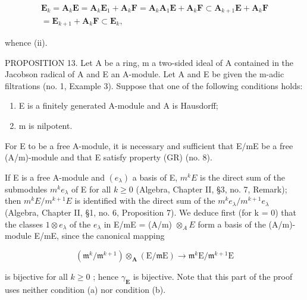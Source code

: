 \[
\begin{array}{r} \mathbf {E} _ {k} = \mathbf {A} _ {k} \mathbf {E} = \mathbf {A} _ {k} \mathbf {E} _ {1} + \mathbf {A} _ {k} \mathbf {F} = \mathbf {A} _ {k} \mathbf {A} _ {1} \mathbf {E} + \mathbf {A} _ {k} \mathbf {F} \subset \mathbf {A} _ {k + 1} \mathbf {E} + \mathbf {A} _ {k} \mathbf {F} \\ = \mathbf {E} _ {k + 1} + \mathbf {A} _ {k} \mathbf {F} \subset \mathbf {E} _ {k}, \end{array}
\]

whence (ii).

PROPOSITION 13. Let A be a ring, m a two-sided ideal of A contained in the Jacobson radical of A and E an A-module. Let A and E be given the m-adic filtrations (no. 1, Example 3). Suppose that one of the following conditions holds:

\begin{enumerate}
\def\labelenumi{(\alph{enumi})}
\item
  E is a finitely generated A-module and A is Hausdorff;
\item
  m is nilpotent.
\end{enumerate}

For E to be a free A-module, it is necessary and sufficient that E/mE be a free (A/m)-module and that E satisfy property (GR) (no. 8).

If E is a free A-module and \((e_{\lambda})\) a basis of E, \(m^{k}E\) is the direct sum of the submodules \(m^{k}e_{\lambda}\) of E for all \(k \geqslant 0\) (Algebra, Chapter II, §3, no. 7, Remark); then \(m^{k}E/m^{k+1}E\) is identified with the direct sum of the \(m^{k}e_{\lambda}/m^{k+1}e_{\lambda}\) (Algebra, Chapter II, §1, no. 6, Proposition 7). We deduce first (for k = 0) that the classes \(1 \otimes e_{\lambda}\) of the \(e_{\lambda}\) in E/mE = (A/m) \(\otimes_{A} E\) form a basis of the (A/m)-module E/mE, since the canonical mapping

\[
\left(\mathfrak {m} ^ {k} / \mathfrak {m} ^ {k + 1}\right) \otimes_ {\mathbf {A}} (\mathrm{E} / \mathfrak {m} \mathrm{E}) \rightarrow \mathfrak {m} ^ {k} \mathrm{E} / \mathfrak {m} ^ {k + 1} \mathrm{E}
\]

is bijective for all \(k \geqslant 0\) ; hence \(\gamma_{\mathbf{E}}\) is bijective. Note that this part of the proof uses neither condition (a) nor condition (b).


